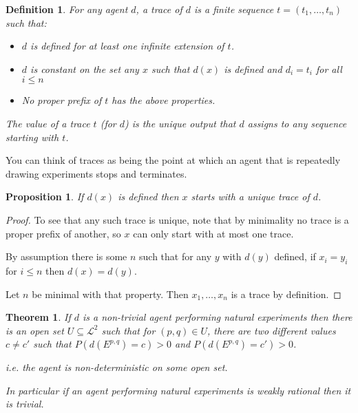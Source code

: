 \documentclass[a4paper]{book}
\newtheorem{definition}{Definition}[section]
\newtheorem{proposition}{Proposition}[section]
\newtheorem{theorem}{Theorem}[section]
\begin{document}
\begin{definition}
For any agent $d$, a trace of $d$ is a finite sequence $t = (t_1, \ldots, t_n)$
such that:

\begin{itemize}
\item $d$ is defined for at least one infinite extension of $t$.
\item $d$ is constant on the set any $x$ such that $d(x)$ is defined
and $d_i = t_i$ for all $i \leq n$
\item No proper prefix of $t$ has the above properties.
\end{itemize}

The value of a trace $t$ (for $d$) is the unique output that $d$ assigns to any
sequence starting with $t$.
\end{definition}

You can think of traces as being the point at which an agent that is repeatedly
drawing experiments stops and terminates.

\begin{proposition}
If $d(x)$
is defined then $x$
starts with a unique trace of $d$.
\end{proposition}

\begin{proof}
To see that any such trace is unique, note that by minimality no
trace is a proper prefix of another, so $x$
can only start with at most one trace.

By assumption there is some $n$
such that for any $y$
with $d(y)$
defined, if $x_i = y_i$
for $i \leq n$
then $d(x) = d(y)$.

Let $n$
be minimal with that property. Then $x_1, \ldots, x_n$
is a trace by definition.
\end{proof}

\begin{theorem}
If $d$ is a non-trivial agent performing natural experiments
then there is an open set $U \subseteq \mathcal{L}^2$
such that for $(p, q) \in U$,
there are two different values $c \neq c'$
such that $P(d(E^{p, q}) = c) > 0$
and $P(d(E^{p, q}) = c') > 0$.

i.e. the agent is non-deterministic on some open set.

In particular if an agent performing natural experiments is
weakly rational then it is trivial.
\end{theorem}
\end{document}
